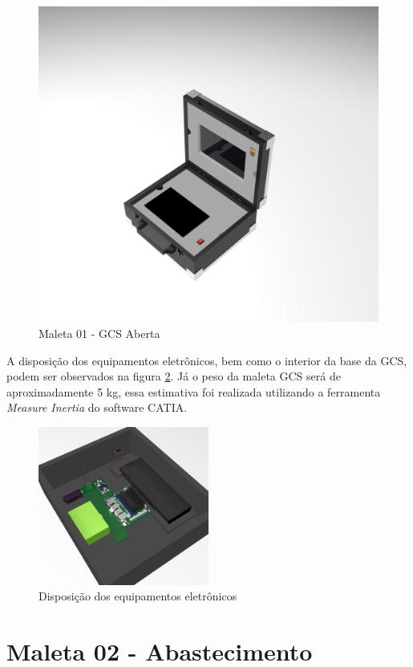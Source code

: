\begin{figure}[H]
    \centering
        \includegraphics[width=0.7\linewidth]{figuras/untitled.18.jpg}
    \caption{\label{fig:Render Maleta GCS02} Maleta 01 - GCS Aberta}
\end{figure}

\par A disposição dos equipamentos eletrônicos, bem como o interior da base da GCS, podem ser observados na figura \ref{fig:Disposicao dos Componentes}. Já o peso da maleta GCS será de aproximadamente 5 kg, essa estimativa foi realizada utilizando a ferramenta \textit{Measure Inertia} do software CATIA.

\begin{figure}[H]
\centering
\includegraphics[width=0.5\textwidth]{figuras/untitled.22.jpg}
\caption{Disposição dos equipamentos eletrônicos}
\label{fig:Disposicao dos Componentes}
\end{figure}


\section{Maleta 02 - Abastecimento}
\label{maleta_02}

